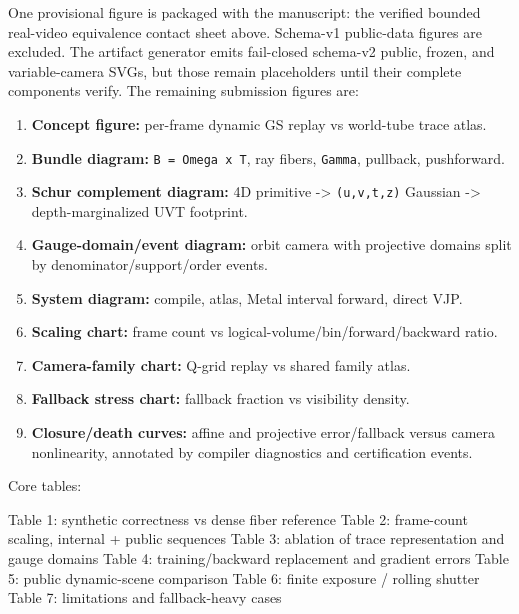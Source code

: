 \documentclass[
]{article}
\newenvironment{Shaded}{}{}
\newcommand{\NormalTok}[1]{#1}
\providecommand{\tightlist}{%
  \setlength{\itemsep}{0pt}\setlength{\parskip}{0pt}}
\begin{document}
One provisional figure is packaged with the manuscript: the verified
bounded real-video equivalence contact sheet above. Schema-v1
public-data figures are excluded. The artifact generator emits
fail-closed schema-v2 public, frozen, and variable-camera SVGs, but
those remain placeholders until their complete components verify. The
remaining submission figures are:

\begin{enumerate}
\def\labelenumi{\arabic{enumi}.}
\tightlist
\item
  \textbf{Concept figure:} per-frame dynamic GS replay vs world-tube
  trace atlas.
\item
  \textbf{Bundle diagram:} \texttt{B\ =\ Omega\ x\ T}, ray fibers,
  \texttt{Gamma}, pullback, pushforward.
\item
  \textbf{Schur complement diagram:} 4D primitive -\textgreater{}
  \texttt{(u,v,t,z)} Gaussian -\textgreater{} depth-marginalized UVT
  footprint.
\item
  \textbf{Gauge-domain/event diagram:} orbit camera with projective
  domains split by denominator/support/order events.
\item
  \textbf{System diagram:} compile, atlas, Metal interval forward,
  direct VJP.
\item
  \textbf{Scaling chart:} frame count vs
  logical-volume/bin/forward/backward ratio.
\item
  \textbf{Camera-family chart:} Q-grid replay vs shared family atlas.
\item
  \textbf{Fallback stress chart:} fallback fraction vs visibility
  density.
\item
  \textbf{Closure/death curves:} affine and projective error/fallback
  versus camera nonlinearity, annotated by compiler diagnostics and
  certification events.
\end{enumerate}

Core tables:

\begin{Shaded}
\begin{Highlighting}[]
\NormalTok{Table 1: synthetic correctness vs dense fiber reference}
\NormalTok{Table 2: frame{-}count scaling, internal + public sequences}
\NormalTok{Table 3: ablation of trace representation and gauge domains}
\NormalTok{Table 4: training/backward replacement and gradient errors}
\NormalTok{Table 5: public dynamic{-}scene comparison}
\NormalTok{Table 6: finite exposure / rolling shutter}
\NormalTok{Table 7: limitations and fallback{-}heavy cases}
\end{Highlighting}
\end{Shaded}
\end{document}
